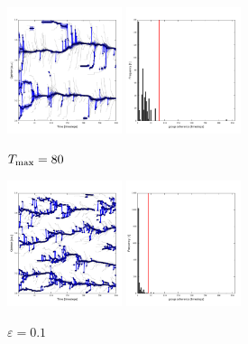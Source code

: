 \documentclass[useAMS,usenatbib]{templates/mn2e}
\begin{document}
\begin{figure}
  \begin{center}
    \includegraphics[width=0.3\textwidth]{fig/evol_80.pdf}
    \includegraphics[width=0.3\textwidth]{fig/var_80.pdf}
  \end{center}
  \caption{\label{fig:80}$T_{\rm max}=80$}
\end{figure}

\begin{figure}
  \begin{center}
    \includegraphics[width=0.3\textwidth]{fig/evol_01.pdf}
    \includegraphics[width=0.3\textwidth]{fig/var_01.pdf}
  \end{center}
  \caption{\label{fig:01}$\varepsilon=0.1$}
\end{figure}
\end{document}
